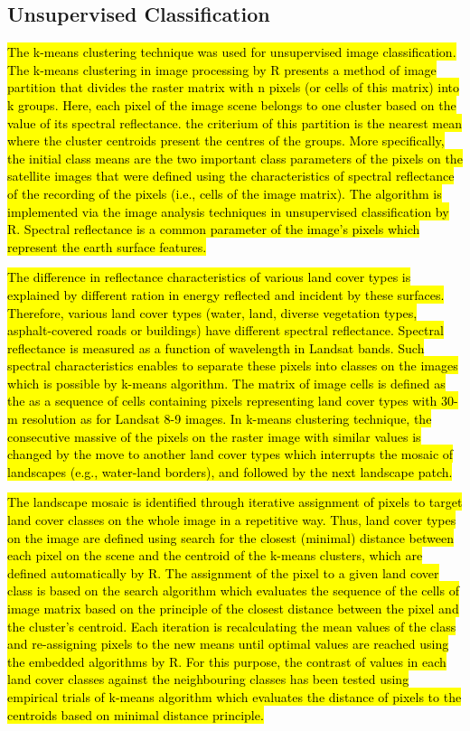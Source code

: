 \documentclass[12pt,a4paper,oneside]{article}
\def \newpar{\vspace{6pt}}
\begin{document}
\subsection*{Unsupervised Classification}

\newpar \hl{The k-means clustering technique was used for unsupervised image classification. The k-means clustering in image processing by R presents a method of image partition that divides the raster matrix with n pixels (or cells of this matrix) into k groups. Here, each pixel of the image scene belongs to one cluster based on the value of its spectral reflectance. the criterium of this partition is the nearest mean where the cluster centroids present the centres of the groups. More specifically, the initial class means are the two important class parameters of the pixels on the satellite images that were defined using the characteristics of spectral reflectance of the recording of the pixels (i.e., cells of the image matrix). The algorithm is implemented via the image analysis techniques in unsupervised classification by R. Spectral reflectance is a common parameter of the image's pixels which represent the earth surface features.}

\newpar \hl{The difference in reflectance characteristics of various land cover types is explained by different ration in energy reflected and incident by these surfaces. Therefore, various land cover types (water, land, diverse vegetation types, asphalt-covered roads or buildings) have different spectral reflectance. Spectral reflectance is measured as a function of wavelength in Landsat bands. Such spectral characteristics enables to separate these pixels into classes on the images which is possible by k-means algorithm. The matrix of image cells is defined as the as a sequence of cells containing pixels representing land cover types with 30-m resolution as for Landsat 8-9 images. In k-means clustering technique, the consecutive massive of the pixels on the raster image with similar values is changed by the move to another land cover types which interrupts the mosaic of landscapes (e.g., water-land borders), and followed by the next landscape patch.  }

\newpar \hl{The landscape mosaic is identified through iterative assignment of pixels to target land cover classes  on the whole image in a repetitive way. Thus, land cover types on the image are defined using search for the closest (minimal) distance between each pixel on the scene and the centroid of the k-means clusters, which are defined automatically by R. The assignment of the pixel to a given land cover class is based on the search algorithm which evaluates the sequence of the cells of image matrix based on the principle of the closest distance between the pixel and the cluster's centroid. Each iteration is recalculating the mean values of the class and re-assigning pixels to the new means until optimal values are reached using the embedded algorithms by R. For this purpose, the contrast of values in each land cover classes against the neighbouring classes has been tested using empirical trials of k-means algorithm which evaluates the distance of pixels to the centroids based on minimal distance principle. }
\end{document}
